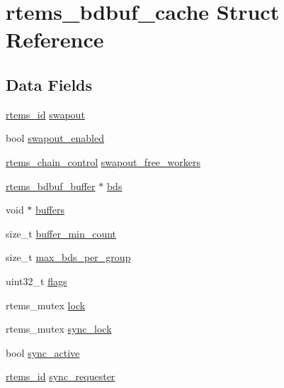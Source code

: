\hypertarget{structrtems__bdbuf__cache}{}\section{rtems\+\_\+bdbuf\+\_\+cache Struct Reference}
\label{structrtems__bdbuf__cache}
\subsection*{Data Fields}
\begin{DoxyCompactItemize}
\item 
\mbox{\hyperlink{group__ClassicTasks_gab20892b814dced7dd4e5b9bf42becd57}{rtems\+\_\+id}} \mbox{\hyperlink{structrtems__bdbuf__cache_a900cf94bc5008688aa29f3b13b5037ea}{swapout}}
\item 
bool \mbox{\hyperlink{structrtems__bdbuf__cache_a4141989f1fe899ea27263e342bdf47d3}{swapout\+\_\+enabled}}
\item 
\mbox{\hyperlink{unionChain__Control}{rtems\+\_\+chain\+\_\+control}} \mbox{\hyperlink{structrtems__bdbuf__cache_aaa1da7af1c3d976fd82c0c04d2dee5fe}{swapout\+\_\+free\+\_\+workers}}
\item 
\mbox{\hyperlink{structrtems__bdbuf__buffer}{rtems\+\_\+bdbuf\+\_\+buffer}} $\ast$ \mbox{\hyperlink{structrtems__bdbuf__cache_add99c1bac7978bf7713175a6542d0bc2}{bds}}
\item 
void $\ast$ \mbox{\hyperlink{structrtems__bdbuf__cache_a1e1e8fc29f39dad8947ac36f186d4012}{buffers}}
\item 
size\+\_\+t \mbox{\hyperlink{structrtems__bdbuf__cache_aa4f14abf46f5285c7ccb01918c4d79ba}{buffer\+\_\+min\+\_\+count}}
\item 
size\+\_\+t \mbox{\hyperlink{structrtems__bdbuf__cache_ae2356c5bf91332764dc5a5e86e91d8f7}{max\+\_\+bds\+\_\+per\+\_\+group}}
\item 
uint32\+\_\+t \mbox{\hyperlink{structrtems__bdbuf__cache_a932ac81fcb0fe3dc603899fa23992617}{flags}}
\item 
rtems\+\_\+mutex \mbox{\hyperlink{structrtems__bdbuf__cache_a892550d7773893baef04661563ac2497}{lock}}
\item 
rtems\+\_\+mutex \mbox{\hyperlink{structrtems__bdbuf__cache_ad748d86d5d754c67f10f508790527680}{sync\+\_\+lock}}
\item 
bool \mbox{\hyperlink{structrtems__bdbuf__cache_abce64fd6325e94add3742a7b40e3dcf1}{sync\+\_\+active}}
\item 
\mbox{\hyperlink{group__ClassicTasks_gab20892b814dced7dd4e5b9bf42becd57}{rtems\+\_\+id}} \mbox{\hyperlink{structrtems__bdbuf__cache_a0afd930bb89f084d34df957fd939d3a8}{sync\+\_\+requester}}

\end{DoxyCompactItemize}
